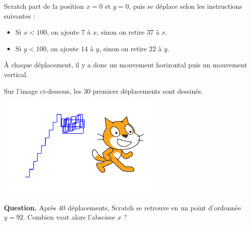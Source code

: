 \documentclass[class=report,crop=false, 12pt]{standalone}
\begin{document}
\begin{enigme}

Scratch part de la position $x=0$ et $y=0$, puis se déplace selon les instructions suivantes :
\begin{itemize}
  \item Si $x < 100$, on ajoute $7$ à $x$, sinon on retire $37$ à $x$.

  \item Si $y<100$, on ajoute $14$ à $y$, sinon on retire $22$ à $y$.
\end{itemize}

À chaque déplacement, il y a donc un mouvement horizontal puis un mouvement vertical.

\bigskip

Sur l'image ci-dessous, les $30$ premiers déplacements sont dessinés.
\begin{center}
  \includegraphics[width=0.6\textwidth]{ecran-07-eg3-new} 
\end{center}


\textbf{Question.}  Après $40$ déplacements, Scratch se retrouve en un point d'ordonnée $y=92$. Combien vaut alors l'abscisse $x$ ?

\bigskip




\end{enigme}
\end{document}
